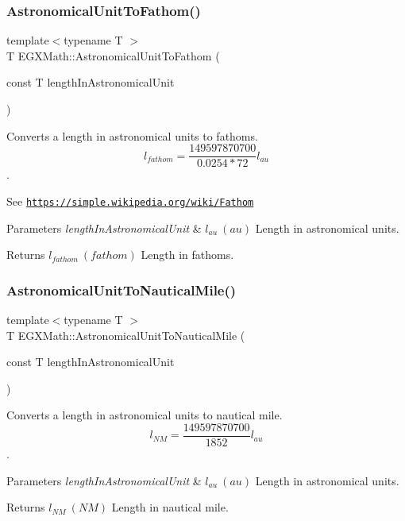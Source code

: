 \subsubsection{\texorpdfstring{Astronomical\+Unit\+To\+Fathom()}{AstronomicalUnitToFathom()}}
{\footnotesize\ttfamily template$<$typename T $>$ \\
T E\+G\+X\+Math\+::\+Astronomical\+Unit\+To\+Fathom (\begin{DoxyParamCaption}\item[{const T}]{length\+In\+Astronomical\+Unit }\end{DoxyParamCaption})}



Converts a length in astronomical units to fathoms. \[ l_{fathom}= \frac{149597870700}{0.0254 * 72} l_{au} \]. 

See \href{https://simple.wikipedia.org/wiki/Fathom}{\tt https\+://simple.\+wikipedia.\+org/wiki/\+Fathom} 
\begin{DoxyParams}{Parameters}
{\em length\+In\+Astronomical\+Unit} & $ l_{au}\ (au)$ Length in astronomical units. \\
\hline
\end{DoxyParams}
\begin{DoxyReturn}{Returns}
$ l_{fathom}\ (fathom)$ Length in fathoms. 
\end{DoxyReturn}
\mbox{\label{group___e_g_x_math-_conversions-_length_conversions-_astronomical-_astronomical_unit-_nautical_ga1d18851a119546f6a8e95e3051559f2e}} 
\subsubsection{\texorpdfstring{Astronomical\+Unit\+To\+Nautical\+Mile()}{AstronomicalUnitToNauticalMile()}}
{\footnotesize\ttfamily template$<$typename T $>$ \\
T E\+G\+X\+Math\+::\+Astronomical\+Unit\+To\+Nautical\+Mile (\begin{DoxyParamCaption}\item[{const T}]{length\+In\+Astronomical\+Unit }\end{DoxyParamCaption})}



Converts a length in astronomical units to nautical mile. \[ l_{NM}= \frac{149597870700}{1852} l_{au} \]. 


\begin{DoxyParams}{Parameters}
{\em length\+In\+Astronomical\+Unit} & $ l_{au}\ (au)$ Length in astronomical units. \\
\hline
\end{DoxyParams}
\begin{DoxyReturn}{Returns}
$ l_{NM}\ (NM)$ Length in nautical mile. 
\end{DoxyReturn}
